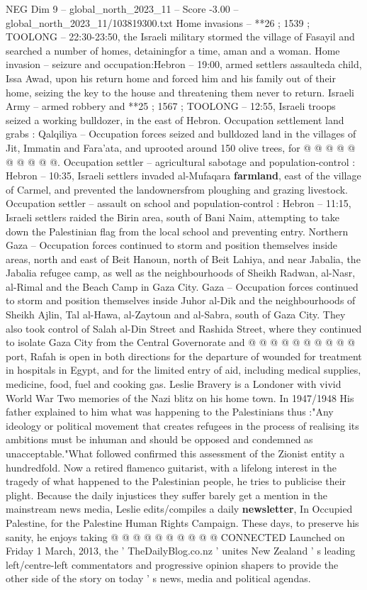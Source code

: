 \begin{textsample}{NEG Dim 9 – global\_north\_2023\_11 – Score -3.00 – global\_north\_2023\_11/103819300.txt}
Home invasions -- **26 ; 1539 ; TOOLONG -- 22:30-23:50, the Israeli military stormed the village of Fasayil and searched a number of homes, detainingfor a time, aman and a woman.
Home invasion -- seizure and occupation:Hebron -- 19:00, armed settlers assaulteda child, Issa Awad, upon his return home and forced him and his family out of their home, seizing the key to the house and threatening them never to return.
Israeli Army -- armed robbery and **25 ; 1567 ; TOOLONG -- 12:55, Israeli troops seized a working bulldozer, in the east of Hebron.
Occupation settlement land grabs : Qalqiliya -- Occupation forces seized and bulldozed land in the villages of Jit, Immatin and Fara'ata, and uprooted around 150 olive trees, for @ @ @ @ @ @ @ @ @ @.
Occupation settler -- agricultural sabotage and population-control : Hebron -- 10:35, Israeli settlers invaded al-Mufaqara \textbf{farmland}, east of the village of Carmel, and prevented the landownersfrom ploughing and grazing livestock.
Occupation settler -- assault on school and population-control : Hebron -- 11:15, Israeli settlers raided the Birin area, south of Bani Naim, attempting to take down the Palestinian flag from the local school and preventing entry.
Northern Gaza -- Occupation forces continued to storm and position themselves inside areas, north and east of Beit Hanoun, north of Beit Lahiya, and near Jabalia, the Jabalia refugee camp, as well as the neighbourhoods of Sheikh Radwan, al-Nasr, al-Rimal and the Beach Camp in Gaza City.
Gaza -- Occupation forces continued to storm and position themselves inside Juhor al-Dik and the neighbourhoods of Sheikh Ajlin, Tal al-Hawa, al-Zaytoun and al-Sabra, south of Gaza City.
They also took control of Salah al-Din Street and Rashida Street, where they continued to isolate Gaza City from the Central Governorate and @ @ @ @ @ @ @ @ @ @ port, Rafah is open in both directions for the departure of wounded for treatment in hospitals in Egypt, and for the limited entry of aid, including medical supplies, medicine, food, fuel and cooking gas.
Leslie Bravery is a Londoner with vivid World War Two memories of the Nazi blitz on his home town.
In 1947/1948 His father explained to him what was happening to the Palestinians thus :"Any ideology or political movement that creates refugees in the process of realising its ambitions must be inhuman and should be opposed and condemned as unacceptable."What followed confirmed this assessment of the Zionist entity a hundredfold.
Now a retired flamenco guitarist, with a lifelong interest in the tragedy of what happened to the Palestinian people, he tries to publicise their plight.
Because the daily injustices they suffer barely get a mention in the mainstream news media, Leslie edits/compiles a daily \textbf{newsletter}, In Occupied Palestine, for the Palestine Human Rights Campaign.
These days, to preserve his sanity, he enjoys taking @ @ @ @ @ @ @ @ @ @ CONNECTED Launched on Friday 1 March, 2013, the ' TheDailyBlog.co.nz ' unites New Zealand ' s leading left/centre-left commentators and progressive opinion shapers to provide the other side of the story on today ' s news, media and political agendas.

\end{textsample}
